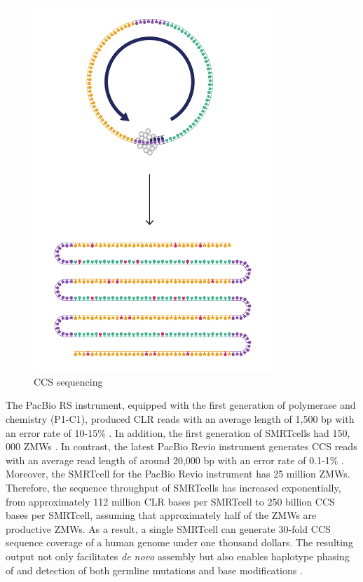 \begin{figure}[htbp!]
\caption{CCS sequencing}
\label{figure:ccs-sequencing}
\begin{centering}
\includegraphics[width=0.8\textwidth]{Vector/CCS_sequencing.pdf}
\end{centering}
\end{figure}

The PacBio RS instrument, equipped with the first generation of polymerase and chemistry (P1-C1), produced CLR reads with an average length of 1,500 bp with an error rate of 10-15\% \cite{Quail2012-cx}. In addition, the first generation of SMRTcells had 150, 000 ZMWs \cite{Rhoads2015-pk}. In contrast, the latest PacBio Revio instrument generates CCS reads with an average read length of around 20,000 bp with an error rate of 0.1-1\% \cite{revio2022}. Moreover, the SMRTcell for the PacBio Revio instrument has 25 million ZMWs. Therefore, the sequence throughput of SMRTcells has increased exponentially, from approximately 112 million CLR bases per SMRTcell to 250 billion CCS bases per SMRTcell, assuming that approximately half of the ZMWs are productive ZMWs. As a result, a single SMRTcell can generate 30-fold CCS sequence coverage of a human genome under one thousand dollars. The resulting output not only facilitates \textit{de novo} assembly \cite{Nurk2020-gu, Cheng2021-ij} but also enables haplotype phasing of \cite{Patterson2015-an} and detection of both germline mutations \cite{Poplin2018-ub} and base modifications \cite{Tse2021-or}. 


